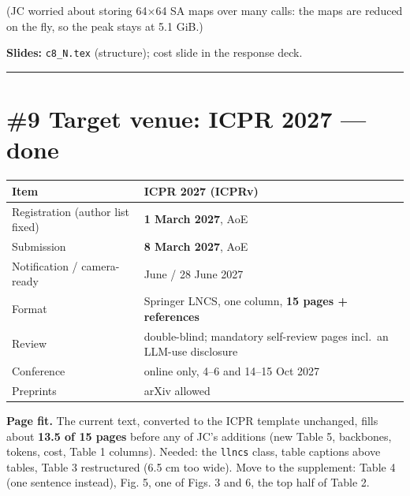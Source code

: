 \documentclass[
  10pt,
]{article}
\newcounter{none} %
\begin{document}
(JC worried about storing 64\ensuremath{\times}64 SA maps over many calls: the maps are
reduced on the fly, so the peak stays at 5.1 GiB.)

\textbf{Slides:} \texttt{c8\_N.tex} (structure); cost slide in the
response deck.

\begin{center}\rule{0.5\linewidth}{0.5pt}\end{center}

\section{\#9 Target venue: ICPR 2027 --- done}

{\def\LTcaptype{none} %
\begin{longtable}[]{@{}
  >{\raggedright\arraybackslash}p{}
  >{\raggedright\arraybackslash}p{}@{}}
\toprule\noalign{}
\begin{minipage}[b]{\linewidth}\raggedright
Item
\end{minipage} & \begin{minipage}[b]{\linewidth}\raggedright
ICPR 2027 (ICPRv)
\end{minipage} \\
\midrule\noalign{}
\endhead
\bottomrule\noalign{}
\endlastfoot
Registration (author list fixed) & \textbf{1 March 2027}, AoE \\
Submission & \textbf{8 March 2027}, AoE \\
Notification / camera-ready & 14 June / 28 June 2027 \\
Format & Springer LNCS, one column, \textbf{15 pages + references} \\
Review & double-blind; mandatory self-review pages incl.~an LLM-use
disclosure \\
Conference & online only, 4--6 and 14--15 Oct 2027 \\
Preprints & arXiv allowed \\
\end{longtable}
}

\textbf{Page fit.} The current text, converted to the ICPR template
unchanged, fills about \textbf{13.5 of 15 pages} before any of JC's
additions (new Table 5, backbones, tokens, cost, Table 1 columns).
Needed: the \texttt{llncs} class, table captions above tables, Table 3
restructured (6.5 cm too wide). Move to the supplement: Table 4 (one
sentence instead), Fig. 5, one of Figs. 3 and 6, the top half of Table
2.
\end{document}
